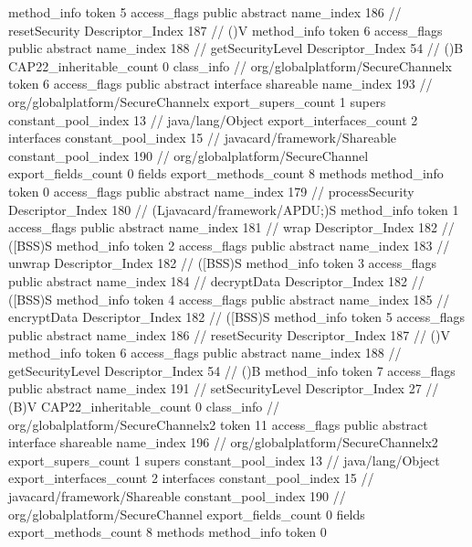 {{{{{				}
				method_info {
					token	5
					access_flags	public abstract
					name_index	186		// resetSecurity
					Descriptor_Index	187		// ()V
				}
				method_info {
					token	6
					access_flags	public abstract
					name_index	188		// getSecurityLevel
					Descriptor_Index	54		// ()B
				}
			}
			CAP22_inheritable_count	0
		}
		class_info {		// org/globalplatform/SecureChannelx
			token	6
			access_flags	public abstract interface shareable
			name_index	193		// org/globalplatform/SecureChannelx
			export_supers_count	1
			supers {
				constant_pool_index	13		// java/lang/Object
			}
			export_interfaces_count	2
			interfaces {
				constant_pool_index	15		// javacard/framework/Shareable
				constant_pool_index	190		// org/globalplatform/SecureChannel
			}
			export_fields_count	0
			fields {
			}
			export_methods_count	8
			methods {
				method_info {
					token	0
					access_flags	public abstract
					name_index	179		// processSecurity
					Descriptor_Index	180		// (Ljavacard/framework/APDU;)S
				}
				method_info {
					token	1
					access_flags	public abstract
					name_index	181		// wrap
					Descriptor_Index	182		// ([BSS)S
				}
				method_info {
					token	2
					access_flags	public abstract
					name_index	183		// unwrap
					Descriptor_Index	182		// ([BSS)S
				}
				method_info {
					token	3
					access_flags	public abstract
					name_index	184		// decryptData
					Descriptor_Index	182		// ([BSS)S
				}
				method_info {
					token	4
					access_flags	public abstract
					name_index	185		// encryptData
					Descriptor_Index	182		// ([BSS)S
				}
				method_info {
					token	5
					access_flags	public abstract
					name_index	186		// resetSecurity
					Descriptor_Index	187		// ()V
				}
				method_info {
					token	6
					access_flags	public abstract
					name_index	188		// getSecurityLevel
					Descriptor_Index	54		// ()B
				}
				method_info {
					token	7
					access_flags	public abstract
					name_index	191		// setSecurityLevel
					Descriptor_Index	27		// (B)V
				}
			}
			CAP22_inheritable_count	0
		}
		class_info {		// org/globalplatform/SecureChannelx2
			token	11
			access_flags	public abstract interface shareable
			name_index	196		// org/globalplatform/SecureChannelx2
			export_supers_count	1
			supers {
				constant_pool_index	13		// java/lang/Object
			}
			export_interfaces_count	2
			interfaces {
				constant_pool_index	15		// javacard/framework/Shareable
				constant_pool_index	190		// org/globalplatform/SecureChannel
			}
			export_fields_count	0
			fields {
			}
			export_methods_count	8
			methods {
				method_info {
					token	0
}}}}}
